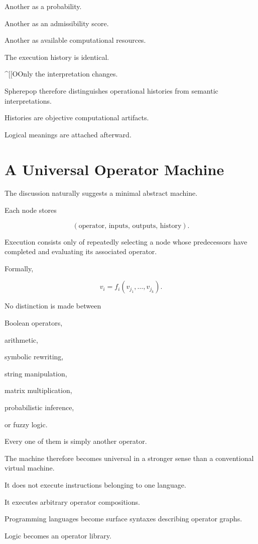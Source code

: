 \documentclass[12pt,oneside]{article}
\begin{document}
Another as a probability.

Another as an admissibility score.

Another as available computational resources.

The execution history is identical.

^[[OOnly the interpretation changes.

Spherepop therefore distinguishes operational histories from semantic interpretations.

Histories are objective computational artifacts.

Logical meanings are attached afterward.

\section{A Universal Operator Machine}

The discussion naturally suggests a minimal abstract machine.

Each node stores

\[
(\text{operator},\,
\text{inputs},\,
\text{outputs},\,
\text{history}).
\]

Execution consists only of repeatedly selecting a node whose predecessors have completed and evaluating its associated operator.

Formally,

\[
v_i
=
f_i(v_{j_1},\ldots,v_{j_k}).
\]

No distinction is made between

Boolean operators,

arithmetic,

symbolic rewriting,

string manipulation,

matrix multiplication,

probabilistic inference,

or fuzzy logic.

Every one of them is simply another operator.

The machine therefore becomes universal in a stronger sense than a conventional virtual machine.

It does not execute instructions belonging to one language.

It executes arbitrary operator compositions.

Programming languages become surface syntaxes describing operator graphs.

Logic becomes an operator library.
\end{document}
